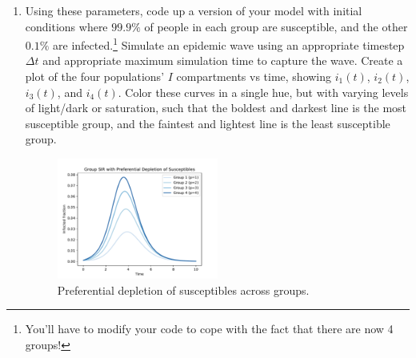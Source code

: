 \documentclass[11pt]{article}
\begin{document}
\begin{enumerate}
\begin{enumerate}[label=\alph*.]
	\item Using these parameters, code up a version of your model with initial conditions where $99.9\%$ of people in each group are susceptible, and the other $0.1\%$ are infected.\footnote{You'll have to modify your code to cope with the fact that there are now 4 groups!} Simulate an epidemic wave using an appropriate timestep $\Delta t$ and appropriate maximum simulation time to capture the wave. Create a plot of the four populations' $I$ compartments vs time, showing $i_1(t)$, $i_2(t)$, $i_3(t)$, and $i_4(t)$. Color these curves in a single hue, but with varying levels of light/dark or saturation, such that the boldest and darkest line is the most susceptible group, and the faintest and lightest line is the least susceptible group.
	\begin{figure}[H]
		\centering
		\includegraphics[width=0.5\textwidth]{1d.pdf}
		\caption{Preferential depletion of susceptibles across groups.}
		\label{fig:preferential_depletion}
	\end{figure}
	

\end{enumerate}
\end{enumerate}
\end{document}

